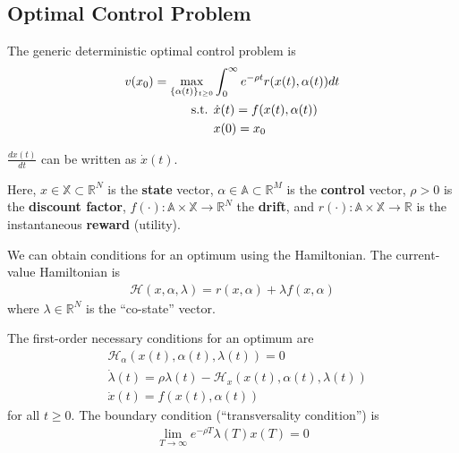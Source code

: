 \documentclass[11pt]{elegantbook}
\begin{document}
\subsection{Optimal Control Problem}
\begin{definition}
    The generic deterministic optimal control problem is
    \begin{equation}
        \begin{aligned}
            v(x_0)=\max_{\{\alpha(t)\}_{t\geq 0}}&\int_0^\infty e^{-\rho t}r(x(t),\alpha(t))dt\\
            \textnormal{s.t. }&\dot{x}(t)=f(x(t),\alpha(t))\\
            &x(0)=x_0
        \end{aligned}
        \nonumber
    \end{equation}
    \begin{note}
        $\frac{dx(t)}{dt}$ can be written as $\dot{x}(t)$.
    \end{note}
    Here, $x\in\mathbb{X}\subset \mathbb{R}^N$ is the \textbf{state} vector, $\alpha\in \mathbb{A}\subset \mathbb{R}^M$ is the \textbf{control} vector, $\rho>0$ is the \textbf{discount factor}, $f(\cdot):\mathbb{A}\times \mathbb{X} \rightarrow \mathbb{R}^N$ the \textbf{drift}, and $r(\cdot):\mathbb{A}\times \mathbb{X} \rightarrow \mathbb{R}$ is the instantaneous \textbf{reward} (utility).
\end{definition}
We can obtain conditions for an optimum using the Hamiltonian.
The current-value Hamiltonian is
    \begin{equation}
        \begin{aligned}
            \mathcal{H}(x,\alpha,\lambda)=r(x,\alpha)+\lambda f(x,\alpha)
        \end{aligned}
        \nonumber
    \end{equation}
where $\lambda\in \mathbb{R}^N$ is the ``co-state'' vector.
\begin{proposition}
    The first-order necessary conditions for an optimum are
    \begin{equation}
        \begin{aligned}
            &\mathcal{H}_\alpha(x(t),\alpha(t),\lambda(t))=0\\
            &\dot{\lambda}(t)=\rho\lambda(t)-\mathcal{H}_x(x(t),\alpha(t),\lambda(t))\\
            &\dot{x}(t)=f(x(t),\alpha(t))
        \end{aligned}
        \nonumber
    \end{equation}
    for all $t\geq 0$.
    The boundary condition (``transversality condition'') is
    \begin{equation}
        \begin{aligned}
            \lim_{T \rightarrow \infty}e^{-\rho T}\lambda(T)x(T)=0
        \end{aligned}
        \nonumber
    \end{equation}
\end{proposition}
\end{document}
